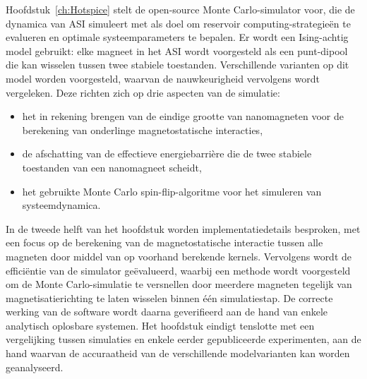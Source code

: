 Hoofdstuk~\ref{ch:Hotspice} stelt de open-source \hotspice Monte Carlo-simulator voor, die de dynamica van ASI simuleert met als doel om reservoir computing-strategie\"en te evalueren en optimale systeemparameters te bepalen.
Er wordt een Ising-achtig model gebruikt: elke magneet in het ASI wordt voorgesteld als een punt-dipool die kan wisselen tussen twee stabiele toestanden.
Verschillende varianten op dit model worden voorgesteld, waarvan de nauwkeurigheid vervolgens wordt vergeleken. %
Deze richten zich op drie aspecten van de simulatie:
\begin{itemize}[noitemsep,nolistsep] %
	\item het in rekening brengen van de eindige grootte van nanomagneten voor de berekening van onderlinge magnetostatische interacties,
	\item de afschatting van de effectieve energiebarri\`ere die de twee stabiele toestanden van een nanomagneet scheidt,
	\item het gebruikte Monte Carlo spin-flip-algoritme voor het simuleren van systeemdynamica.
\end{itemize}
In de tweede helft van het hoofdstuk worden implementatiedetails besproken, met een focus op de berekening van de magnetostatische interactie tussen alle magneten door middel van op voorhand berekende kernels.
Vervolgens wordt de effici\"entie van de simulator ge\"evalueerd, waarbij een methode wordt voorgesteld om de Monte Carlo-simulatie te versnellen door meerdere magneten tegelijk van magnetisatierichting te laten wisselen binnen \'e\'en simulatiestap.
De correcte werking van de software wordt daarna geverifieerd aan de hand van enkele analytisch oplosbare systemen.
Het hoofdstuk eindigt tenslotte met een vergelijking tussen simulaties en enkele eerder gepubliceerde experimenten, aan de hand waarvan de accuraatheid van de verschillende modelvarianten kan worden geanalyseerd. \\

